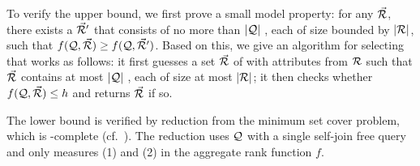 \vspace{-0.4ex}

\begin{proofS}
To verify the upper bound, we first prove a small model
property: for any \bds $\vec{{\mathcal R}}$, there exists a \bds $\vec{{\mathcal R}}'$
that consists of no more than $|{\mathcal Q}|$ \bss, each of size
bounded by $|{\mathcal R}|$, such that $f(\mathcal Q, \vec{{\mathcal R}}) \geq f(\mathcal Q,
\vec{{\mathcal R}}')$. Based on this, we give an \NP algorithm for selecting
  \bds that works as follows:
it first guesses a set $\vec{{\mathcal R}}$ of \bss with attributes from
${\mathcal R}$ such that $\vec{{\mathcal R}}$ contains at most $|{\mathcal Q}|$ \bss,
each of size at most $|{\mathcal R}|$;
it then checks whether $f(\mathcal Q, \vec{{\mathcal R}})\leq h$ and returns
$\vec{{\mathcal R}}$ if so.

The lower bound is verified by
reduction from the minimum set cover problem, which is
\NP-complete (cf.~\cite{GaJo79}).
The reduction uses $\mathcal Q$ with a single
self-join free \SPC query and only measures (1) and (2) in the
aggregate rank function $f$.
\end{proofS}



